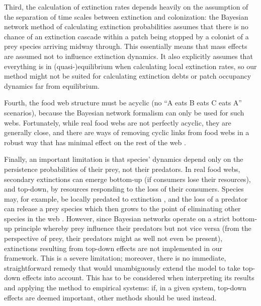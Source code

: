 \documentclass[11pt]{article}
\begin{document}
Third, the calculation of extinction rates depends heavily on the assumption of the separation of time scales between extinction and colonization: the Bayesian network method of calculating extinction probabilities assumes that there is no chance of an extinction cascade within a patch being stopped by a colonist of a prey species arriving midway through. This essentially means that mass effects are assumed not to influence extinction dynamics. It also explicitly assumes that everything is in (quasi-)equilibrium when calculating local extinction rates, so our method might not be suited for calculating extinction debts or patch occupancy dynamics far from equilibrium.

Fourth, the food web structure must be acyclic (no ``A eats B eats C eats A'' scenarios), because the Bayesian network formalism can only be used for such webs. Fortunately, while real food webs are not perfectly acyclic, they are generally close, and there are ways of removing cyclic links from food webs in a robust way that has minimal effect on the rest of the web \citep{Allesinaetal2009, Eklofetal2013MEE}.

Finally, an important limitation is that species' dynamics depend only on the persistence probabilities of their prey, not their predators. In real food webs, secondary extinctions can emerge bottom-up (if consumers lose their resources), and top-down, by resources responding to the loss of their consumers. Species may, for example, be locally predated to extinction \citep{Huffaker1958, Schoeneretal2001}, and the loss of a predator can release a prey species which then grows to the point of eliminating other species in the web \citep{Paine1966, Paine1974, LaffertySuchanek2016}. However, since Bayesian networks operate on a strict bottom-up principle whereby prey influence their predators but not vice versa (from the perspective of prey, their predators might as well not even be present), extinctions resulting from top-down effects are not implemented in our framework. This is a severe limitation; moreover, there is no immediate, straightforward remedy that would unambiguously extend the model to take top-down effects into account. This has to be considered when interpreting its results and applying the method to empirical systems: if, in a given system, top-down effects are deemed important, other methods should be used instead.
\end{document}

